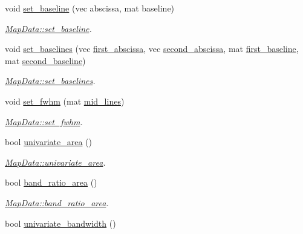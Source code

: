 \begin{DoxyCompactItemize}
void \hyperlink{class_map_data_a5894d1e395e80ba4c15e22438bc21bd3}{set\+\_\+baseline} (vec abscissa, mat baseline)
\begin{DoxyCompactList}\small\item\em \hyperlink{class_map_data_a5894d1e395e80ba4c15e22438bc21bd3}{Map\+Data\+::set\+\_\+baseline}. \end{DoxyCompactList}\item 
void \hyperlink{class_map_data_a214dc643b724e8d0094e440e70f66b4b}{set\+\_\+baselines} (vec \hyperlink{class_map_data_a6c73650238e622489f4ba5ae580e0c84}{first\+\_\+abscissa}, vec \hyperlink{class_map_data_a16fba2ab43dd4480662a2a1d76611352}{second\+\_\+abscissa}, mat \hyperlink{class_map_data_a02dfe98d659e8eac8bf8eec4c376223f}{first\+\_\+baseline}, mat \hyperlink{class_map_data_afd3efd4d5aad351c03f2a68d62deaa4a}{second\+\_\+baseline})
\begin{DoxyCompactList}\small\item\em \hyperlink{class_map_data_a214dc643b724e8d0094e440e70f66b4b}{Map\+Data\+::set\+\_\+baselines}. \end{DoxyCompactList}\item 
void \hyperlink{class_map_data_a2520ff301a4e5460f9e138f86298b66e}{set\+\_\+fwhm} (mat \hyperlink{class_map_data_a95f9011ac33e065d58f2bf26b0db9580}{mid\+\_\+lines})
\begin{DoxyCompactList}\small\item\em \hyperlink{class_map_data_a2520ff301a4e5460f9e138f86298b66e}{Map\+Data\+::set\+\_\+fwhm}. \end{DoxyCompactList}\item 
bool \hyperlink{class_map_data_a431880bb19b6845d2e9315306c0af0a2}{univariate\+\_\+area} ()
\begin{DoxyCompactList}\small\item\em \hyperlink{class_map_data_a431880bb19b6845d2e9315306c0af0a2}{Map\+Data\+::univariate\+\_\+area}. \end{DoxyCompactList}\item 
bool \hyperlink{class_map_data_a5ac3afb97da8c1b45e698db88d604974}{band\+\_\+ratio\+\_\+area} ()
\begin{DoxyCompactList}\small\item\em \hyperlink{class_map_data_a5ac3afb97da8c1b45e698db88d604974}{Map\+Data\+::band\+\_\+ratio\+\_\+area}. \end{DoxyCompactList}\item 
bool \hyperlink{class_map_data_af54e11703d6d0d276e056fc5302b5e7c}{univariate\+\_\+bandwidth} ()

\end{DoxyCompactItemize}
